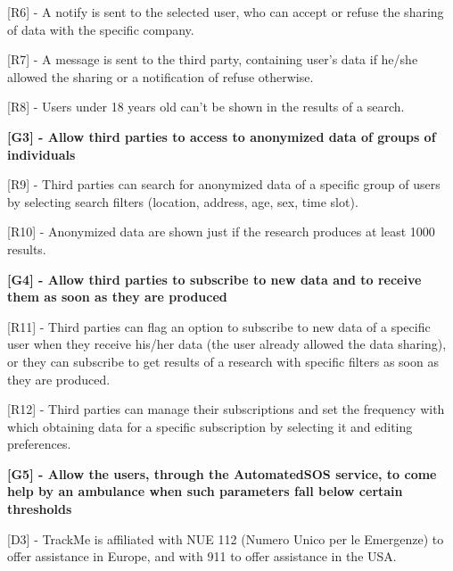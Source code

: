 [R6] - A notify is sent to the selected user, who can accept or refuse the sharing of data with the specific company. \newline

[R7] - A message is sent to the third party, containing user's data if he/she allowed the sharing or a notification of refuse otherwise. \newline

[R8] - Users under 18 years old can't be shown in the results of a search. \newline

\hspace{-\parindent}\textbf{[G3] - Allow third parties to access to anonymized data of groups of individuals} \newline

[R9] - Third parties can search for anonymized data of a specific group of users by selecting search filters (location, address, age, sex, time slot). \newline

[R10] - Anonymized data are shown just if the research produces at least 1000 results. \newline

\hspace{-\parindent}\textbf{[G4] - Allow third parties to subscribe to new data and to receive them as soon as they are produced} \newline

[R11] - Third parties can flag an option to subscribe to new data of a specific user when they receive his/her data (the user already allowed the data sharing), or they can subscribe to get results of a research with specific filters as soon as they are produced. \newline

[R12] - Third parties can manage their subscriptions and set the frequency with which obtaining data for a specific subscription by selecting it and editing preferences. \newline

\hspace{-\parindent}\textbf{[G5] - Allow the users, through the AutomatedSOS service, to come help by an ambulance when such parameters fall below certain thresholds} \newline

[D3] - TrackMe is affiliated with NUE 112 (Numero Unico per le Emergenze) to offer assistance in Europe, and with 911 to offer assistance in the USA. \newline

